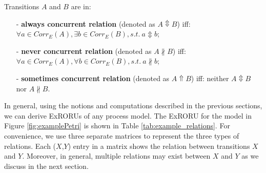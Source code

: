 \documentclass{llncs}
\begin{document}
\begin{definition}\label{def:concurrentRelations}
Transitions $A$ and $B$ are in: 
	\begin{itemize}
		\item[-] \textbf{always concurrent relation} (denoted as $A\Updownarrow B$) iff: $\forall a\in Corr_{E}(A),\exists b\in Corr_{E}(B),s.t.~a\Updownarrow b$;
		\item[-] \textbf{never concurrent relation} (denoted as $A\nparallel B$) iff: $\forall a\in Corr_{E}(A),\forall b\in Corr_{E}(B), s.t.~a\nparallel b$;
		\item[-] \textbf{sometimes concurrent relation} (denoted as $A\Uparrow B$) iff: neither $A\Updownarrow B$ nor $A\nparallel B$.
	\end{itemize}
\end{definition}

In general, using the notions and computations described in the previous sections, we can derive ExRORUs of any process model. The ExRORU for the model in Figure \ref{fig:examplePetri} is shown in Table \ref{tab:example_relations}. For convenience, we use three separate matrices to represent the three types of relations. Each ($X$,$Y$) entry in a matrix shows the relation between transitions $X$ and $Y$. Moreover, in general, multiple relations may exist between $X$ and $Y$ as we discuss in the next section.
\end{document}
